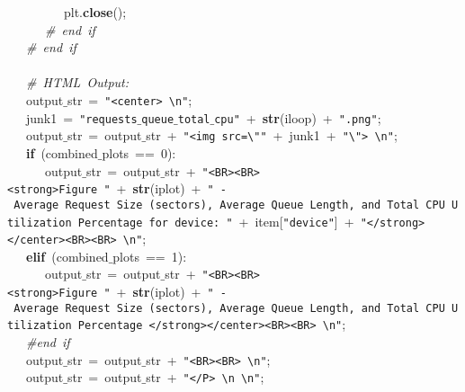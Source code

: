 \mbox{}\ \ \ \ \ \ \ \ \ plt.\textbf{close}(); \\
\mbox{}\ \ \ \ \ \ \textit{\#\ end\ if} \\
\mbox{}\ \ \ \textit{\#\ end\ if} \\
\mbox{}\ \ \  \\
\mbox{}\ \ \ \textit{\#\ HTML\ Output:} \\
\mbox{}\ \ \ output$\_$str\ =\ \texttt{"{}\textless{}center\textgreater{}\ \textbackslash{}n"{}}; \\
\mbox{}\ \ \ junk1\ =\ \texttt{"{}requests$\_$queue$\_$total$\_$cpu"{}}\ +\ \textbf{str}(iloop)\ +\ \texttt{"{}.png"{}}; \\
\mbox{}\ \ \ output$\_$str\ =\ output$\_$str\ +\ \texttt{"{}\textless{}img\ src=\textbackslash{}"{}"{}}\ +\ junk1\ +\ \texttt{"{}\textbackslash{}"{}\textgreater{}\ \textbackslash{}n"{}}; \\
\mbox{}\ \ \ \textbf{if}\ (combined$\_$plots\ ==\ 0): \\
\mbox{}\ \ \ \ \ \ output$\_$str\ =\ output$\_$str\ +\ \texttt{"{}\textless{}BR\textgreater{}\textless{}BR\textgreater{}\textless{}strong\textgreater{}Figure\ "{}}\ +\ \textbf{str}(iplot)\ +\ \texttt{"{}\ -\ Average\ Request\ Size\ (sectors),\ Average\ Queue\ Length,\ and\ Total\ CPU\ Utilization\ Percentage\ for\ device:\ "{}}\ +\ item[\texttt{"{}device"{}}]\ +\ \texttt{"{}\textless{}/strong\textgreater{}\textless{}/center\textgreater{}\textless{}BR\textgreater{}\textless{}BR\textgreater{}\ \textbackslash{}n"{}}; \\
\mbox{}\ \ \ \textbf{elif}\ (combined$\_$plots\ ==\ 1): \\
\mbox{}\ \ \ \ \ \ output$\_$str\ =\ output$\_$str\ +\ \texttt{"{}\textless{}BR\textgreater{}\textless{}BR\textgreater{}\textless{}strong\textgreater{}Figure\ "{}}\ +\ \textbf{str}(iplot)\ +\ \texttt{"{}\ -\ Average\ Request\ Size\ (sectors),\ Average\ Queue\ Length,\ and\ Total\ CPU\ Utilization\ Percentage\ \textless{}/strong\textgreater{}\textless{}/center\textgreater{}\textless{}BR\textgreater{}\textless{}BR\textgreater{}\ \textbackslash{}n"{}}; \\
\mbox{}\ \ \ \textit{\#end\ if} \\
\mbox{}\ \ \ output$\_$str\ =\ output$\_$str\ +\ \texttt{"{}\textless{}BR\textgreater{}\textless{}BR\textgreater{}\ \textbackslash{}n"{}}; \\
\mbox{}\ \ \ output$\_$str\ =\ output$\_$str\ +\ \texttt{"{}\textless{}/P\textgreater{}\ \textbackslash{}n\ \textbackslash{}n"{}}; \\
